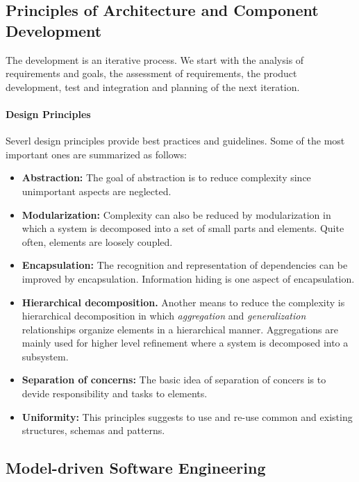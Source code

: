
\subsection{Principles of Architecture and Component Development}

The development is an iterative process. We start with the analysis of requirements and goals,
the assessment of requirements, the product development, test and integration and planning of the next iteration.


\paragraph{Design Principles}
Severl design principles provide best practices and guidelines. Some of the most important ones are
summarized as follows:

\begin{itemize}
	\item \textbf{Abstraction:} The goal of abstraction is to reduce complexity since 
	unimportant aspects are neglected.
	\item \textbf{Modularization:} Complexity can also be reduced by modularization in which a system is decomposed
	into a set of small parts and elements. Quite often, elements are loosely coupled.
	\item \textbf{Encapsulation:}  The recognition and representation of dependencies can be
	  improved by encapsulation. Information hiding is one aspect of encapsulation.
	\item \textbf{Hierarchical decomposition.} Another means to reduce the complexity is hierarchical decomposition
	in which \emph{aggregation} and \emph{generalization} relationships organize elements in a hierarchical manner.
	Aggregations are mainly used for higher level refinement where a system is decomposed into a subsystem.
	\item \textbf{Separation of concerns:} The basic idea of separation of concers is to devide responsibility
	  and tasks to elements.
	\item \textbf{Uniformity:} This principles suggests to use and re-use common 
	  and existing structures, schemas and patterns.	
\end{itemize}

\subsection{Model-driven Software Engineering}

